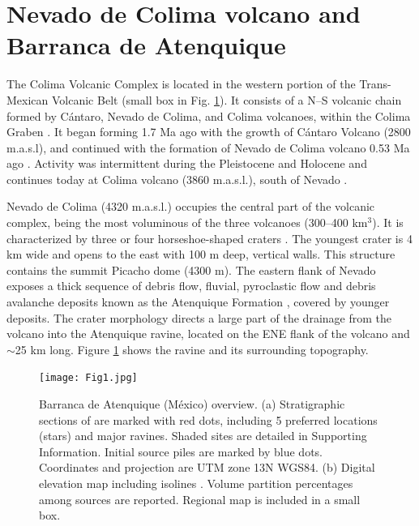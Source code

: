 \documentclass[nhess, manuscript]{copernicus}
\begin{document}
\section{Nevado de Colima volcano and Barranca de Atenquique}\label{s1}
The Colima Volcanic Complex is located in the western portion of the Trans-Mexican Volcanic Belt (small box in Fig. \ref{Fig1}). It consists of a N--S volcanic chain formed by C\'antaro, Nevado de Colima, and Colima volcanoes, within the Colima Graben \citep{Luhr1990}. It began forming 1.7 Ma ago with the growth of C\'antaro Volcano (2800 m.a.s.l), and continued with the formation of Nevado de Colima volcano 0.53 Ma ago \citep{Allan1986, Robin1987}. Activity was intermittent during the Pleistocene and Holocene and continues today at Colima volcano (3860 m.a.s.l.), south of  Nevado  \citep{Saucedo2010, Zobin2015, Macorps2018}.

Nevado de Colima (4320 m.a.s.l.) occupies the central part of the volcanic complex, being the most voluminous of the three volcanoes (300--400 km$^3$). It is characterized by three or four horseshoe-shaped craters \citep{Cortes2010}. The youngest crater is 4 km wide and opens to the east with 100 m deep, vertical walls. This structure contains the summit Picacho dome (4300 m). The eastern flank of Nevado exposes a thick sequence of debris flow, fluvial, pyroclastic flow and debris avalanche deposits known as the Atenquique Formation \citep{Mooser1961, Cortes2005, Saucedo2008}, covered by younger deposits. The crater morphology directs a large part of the drainage from the volcano into the Atenquique ravine, located on the ENE flank of the volcano and $\sim$25 km long. Figure \ref{Fig1} shows the ravine and its surrounding topography.

\begin{figure}[H]
\centering
\texttt{[image: Fig1.jpg]}
\caption{Barranca de Atenquique (M{\'e}xico) overview. (a) Stratigraphic sections of \citep{Saucedo2008} are marked with red dots, including 5 preferred locations (stars) and major ravines. Shaded sites are detailed in Supporting Information. Initial source piles are marked by blue dots. Coordinates and projection are UTM zone 13N WGS84. (b) Digital elevation map including isolines \citep{NASA2014}. Volume partition percentages among sources are reported. Regional map is included in a small box.}
\label{Fig1}
\end{figure}
\end{document}
